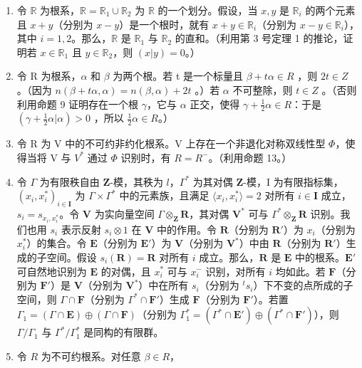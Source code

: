 \begin{enumerate}
\def\labelenumi{\arabic{enumi})}
\item
  令 \(\mathbb{R}\) 为根系，\(\mathbb{R} = \mathbb{R}_1 \cup \mathbb{R}_2\) 为 \(\mathbb{R}\) 的一个划分。假设，当 \(x, y\) 是 \(\mathbb{R}_i\) 的两个元素且 \(x + y\)（分别为 \(x - y\)）是一个根时，就有 \(x + y \in \mathbb{R}_i\)（分别为 \(x - y \in \mathbb{R}_i\)），其中 \(i = 1, 2\)。那么，\(\mathbb{R}\) 是 \(\mathbb{R}_1\) 与 \(\mathbb{R}_2\) 的直和。（利用第 3 号定理 1 的推论，证明若 \(x \in \mathbb{R}_1\) 且 \(y \in \mathbb{R}_2\)，则 \((x|y) = 0\)。）
\item
  令 R 为根系，\(\alpha\) 和 \(\beta\) 为两个根。若 t 是一个标量且 \(\beta + t\alpha \in R\) ，则 \(2t \in Z\) 。（因为 \(n(\beta + t\alpha, \alpha) = n(\beta, \alpha) + 2t\) 。）若 \(\alpha\) 不可整除，则 \(t \in Z\) 。（否则利用命题 9 证明存在一个根 \(\gamma\)，它与 \(\alpha\) 正交，使得 \(\gamma + \frac{1}{2}\alpha \in R\)：于是 \((\gamma + \frac{1}{2}\alpha|\alpha) > 0\) ，所以 \(\frac{1}{2}\alpha \in R\)。）
\item
  令 R 为 V 中的不可约非约化根系。V 上存在一个非退化对称双线性型 \(\Phi\)，使得当将 V 与 \(V^{*}\) 通过 \(\Phi\) 识别时，有 \(R = R^{-}\)。（利用命题 13。）
\item
  令 \(\Gamma\) 为有限秩自由 \(\mathbf{Z}\)-模，其秩为 \(l\)，\(\Gamma^{*}\) 为其对偶 \(\mathbf{Z}\)-模，I 为有限指标集，\((x_{i}, x_{i}^{*})_{i \in \mathbf{I}}\) 为 \(\Gamma \times \Gamma^{*}\) 中的元素族，且满足 \(\langle x_{i}, x_{i}^{*} \rangle = 2\) 对所有 \(i \in \mathbf{I}\) 成立，\(s_{i} = s_{x_{i}, x_{i}^{*}}\)。令 \(\mathbf{V}\) 为实向量空间 \(\Gamma \otimes_{\mathbf{Z}} \mathbf{R}\)，其对偶 \(\mathbf{V}^{*}\) 可与 \(\Gamma^{*} \otimes_{\mathbf{Z}} \mathbf{R}\) 识别。我们也用 \(s_{i}\) 表示反射 \(s_{i} \otimes 1\) 在 \(\mathbf{V}\) 中的作用。令 \(\mathbf{R}\)（分别为 \(\mathbf{R}'\)）为 \(x_{i}\)（分别为 \(x_{i}^{*}\)）的集合。令 \(\mathbf{E}\)（分别为 \(\mathbf{E}'\)）为 \(\mathbf{V}\)（分别为 \(\mathbf{V}^{*}\)）中由 \(\mathbf{R}\)（分别为 \(\mathbf{R}'\)）生成的子空间。假设 \(s_{i}(\mathbf{R}) = \mathbf{R}\) 对所有 \(i\) 成立。那么，\(\mathbf{R}\) 是 \(\mathbf{E}\) 中的根系。\(\mathbf{E}'\) 可自然地识别为 \(\mathbf{E}\) 的对偶，且 \(x_{i}^{*}\) 可与 \(x_{i}^{-}\) 识别，对所有 \(i\) 均如此。若 \(\mathbf{F}\)（分别为 \(\mathbf{F}'\)）是 \(\mathbf{V}\)（分别为 \(\mathbf{V}^{*}\)）中在所有 \(s_{i}\)（分别为 \(^t s_{i}\)）下不变的点所成的子空间，则 \(\Gamma \cap \mathbf{F}\)（分别为 \(\Gamma^{*} \cap \mathbf{F}'\)）生成 \(\mathbf{F}\)（分别为 \(\mathbf{F}'\)）。若置 \(\Gamma_{1} = (\Gamma \cap \mathbf{E}) \oplus (\Gamma \cap \mathbf{F})\)（分别为 \(\Gamma_{1}^{*} = (\Gamma^{*} \cap \mathbf{E}') \oplus (\Gamma^{*} \cap \mathbf{F}')\)），则 \(\Gamma / \Gamma_{1}\) 与 \(\Gamma^{*} / \Gamma_{1}^{*}\) 是同构的有限群。
\item
  令 \(R\) 为不可约根系。对任意 \(\beta \in R\)，
\end{enumerate}

